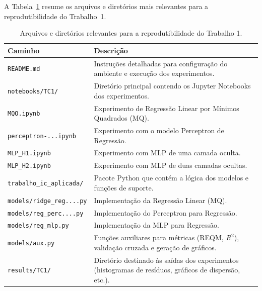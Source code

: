 A Tabela~\ref{tab:estrutura_arquivos_tc1} resume os arquivos e diretórios mais relevantes para a reprodutibilidade do Trabalho~1.

\begin{table}[h!]
\centering
\caption{Arquivos e diretórios relevantes para a reprodutibilidade do Trabalho 1.}
\label{tab:estrutura_arquivos_tc1}
\begin{tabular}{p{5.5cm} p{8cm}}
\toprule
\textbf{Caminho} & \textbf{Descrição} \\
\midrule
\texttt{README.md} & Instruções detalhadas para configuração do ambiente e execução dos experimentos. \\
\texttt{notebooks/TC1/} & Diretório principal contendo os Jupyter Notebooks dos experimentos. \\
\hspace{1em}\texttt{MQO.ipynb} & Experimento de Regressão Linear por Mínimos Quadrados (MQ). \\
\hspace{1em}\texttt{perceptron-...ipynb} & Experimento com o modelo Perceptron de Regressão. \\
\hspace{1em}\texttt{MLP\_H1.ipynb} & Experimento com MLP de uma camada oculta. \\
\hspace{1em}\texttt{MLP\_H2.ipynb} & Experimento com MLP de duas camadas ocultas. \\
\texttt{trabalho\_ic\_aplicada/} & Pacote Python que contém a lógica dos modelos e funções de suporte. \\
\hspace{1em}\texttt{models/ridge\_reg....py} & Implementação da Regressão Linear (MQ). \\
\hspace{1em}\texttt{models/reg\_perc....py} & Implementação do Perceptron para Regressão. \\
\hspace{1em}\texttt{models/reg\_mlp.py} & Implementação da MLP para Regressão. \\
\hspace{1em}\texttt{models/aux.py} & Funções auxiliares para métricas (REQM, $R^2$), validação cruzada e geração de gráficos. \\
\texttt{results/TC1/} & Diretório destinado às saídas dos experimentos (histogramas de resíduos, gráficos de dispersão, etc.). \\
\bottomrule
\end{tabular}
\end{table}



